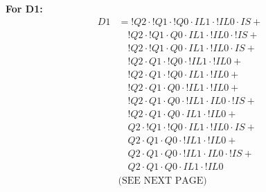\begin{multicols}{2}
    \textbf{For D1:}
    \begin{align*}
        D1 &=     !Q2 \cdot !Q1 \cdot !Q0 \cdot  IL1 \cdot !IL0 \cdot  IS + \\
           &\quad !Q2 \cdot !Q1 \cdot  Q0 \cdot  IL1 \cdot !IL0 \cdot !IS + \\
           &\quad !Q2 \cdot !Q1 \cdot  Q0 \cdot  IL1 \cdot !IL0 \cdot  IS + \\
           &\quad !Q2 \cdot  Q1 \cdot !Q0 \cdot !IL1 \cdot !IL0 + \\
           &\quad !Q2 \cdot  Q1 \cdot !Q0 \cdot  IL1 \cdot !IL0 + \\
           &\quad !Q2 \cdot  Q1 \cdot  Q0 \cdot !IL1 \cdot !IL0 + \\
           &\quad !Q2 \cdot  Q1 \cdot  Q0 \cdot !IL1 \cdot  IL0 \cdot !IS + \\
           &\quad !Q2 \cdot  Q1 \cdot  Q0 \cdot  IL1 \cdot !IL0 + \\
           &\quad  Q2 \cdot !Q1 \cdot !Q0 \cdot  IL1 \cdot !IL0 \cdot  IS + \\
           &\quad  Q2 \cdot  Q1 \cdot  Q0 \cdot !IL1 \cdot !IL0 + \\
           &\quad  Q2 \cdot  Q1 \cdot  Q0 \cdot !IL1 \cdot  IL0 \cdot !IS + \\
           &\quad  Q2 \cdot  Q1 \cdot  Q0 \cdot  IL1 \cdot !IL0 \\
           &\text{(SEE NEXT PAGE)}
    \end{align*}
\end{multicols}

\newpage

